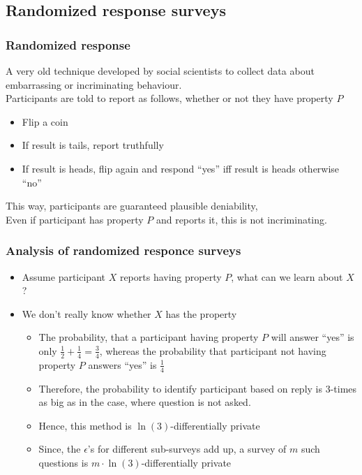 \documentclass[xcolor=dvipsnames]{beamer}
\newcommand{\itm}{\pause\item}
\begin{document}
    \subsection{Randomized response surveys}    
      \begin{frame} %
      	\frametitle{Randomized response}
      	A very old technique developed by social scientists to collect data about embarrassing or incriminating behaviour. \\
      	\pause Participants are told to report as follows, whether or not they have property $P$
      	\begin{itemize}
      	  \itm Flip a coin
      	  \itm If result is tails, report truthfully
      	  \itm If result is heads, flip again and respond ``yes'' iff result is heads otherwise ``no''
      	\end{itemize}
      	This way, participants are guaranteed plausible deniability, \\\pause Even if participant has property $P$ and reports it, this is not incriminating.
      \end{frame}
      \begin{frame} %
        \frametitle{Analysis of randomized responce surveys}
        \begin{itemize}
          \itm Assume participant $X$ reports having property $P$, what can we learn about $X$?
          \itm We don't really know whether $X$ has the property 
          \begin{itemize}
          	\itm[$\hookrightarrow$] The probability, that a participant having property $P$ will answer ``yes'' is only $\frac{1}{2}+\frac{1}{4}=\frac{3}{4}$, whereas the probability that participant not having property $P$ answers ``yes'' is $\frac{1}{4}$
          	\itm[$\hookrightarrow$] Therefore, the probability to identify participant based on reply is $3$-times as big as in the case, where question is not asked.
          	\itm[$\hookrightarrow$] Hence, this method is $\ln(3)$-differentially private
          	\itm[$\hookrightarrow$] Since, the $\epsilon$'s for different sub-surveys add up, a survey of $m$ such questions is $m\cdot \ln(3)$-differentially private
          \end{itemize}
    	\end{itemize}
      \end{frame}
      
\end{document}
